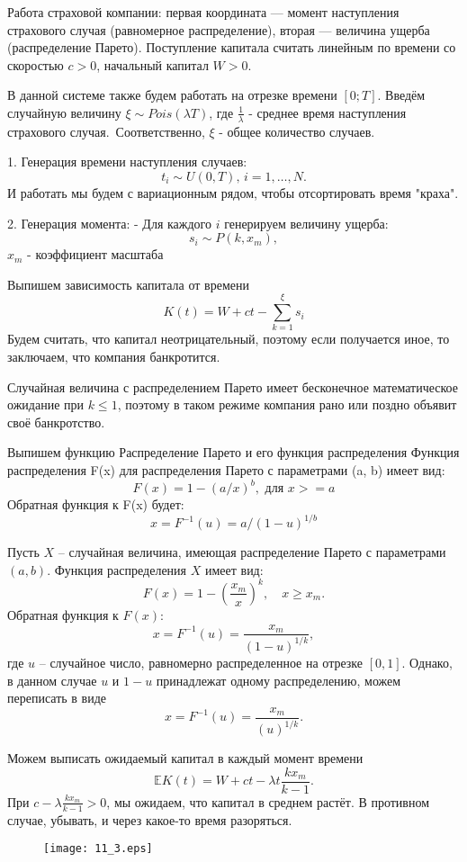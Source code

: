 \documentclass[11pt]{article}
\begin{document}
Работа страховой компании: первая координата — момент наступления страхового случая (равномерное распределение), вторая — величина ущерба (распределение Парето). Поступление капитала считать линейным по времени со скоростью $c > 0$, начальный капитал $W > 0$.


В данной системе также будем работать на отрезке времени $[0;T]$. Введём случайную величину $\xi \sim Pois (\lambda T)$, где $\frac{1}{\lambda}$ - среднее время наступления страхового случая.\
Соответственно, $\xi$ - общее количество случаев.

1. Генерация времени наступления случаев:
   $$
   t_i \sim U(0, T), \, i = 1, \dots, N.
   $$
   И работать мы будем с вариационным рядом, чтобы отсортировать время "краха".
   
2. Генерация момента:
   - Для каждого $i$ генерируем величину ущерба:
   $$
   s_i \sim P(k, x_m),
   $$
   $x_m$ - коэффициент масштаба

   
Выпишем зависимость капитала от времени
$$
    K(t) = W + ct - \sum_{k=1}^{\xi}s_i
$$
Будем считать, что капитал неотрицательный, поэтому если получается иное, то заключаем, что компания банкротится.

Случайная величина с распределением Парето имеет бесконечное математическое ожидание при $k \leqslant 1$, поэтому в таком режиме компания рано или поздно объявит своё банкротство. 

Выпишем функцию 
Распределение Парето и его функция распределения
Функция распределения F(x) для распределения Парето с параметрами (a, b) имеет вид:
$$
F(x) = 1 - (a/x)^b,  \text{ для } x >= a
$$
Обратная функция к F(x) будет:
$$
  x = F^{-1}(u) = a / (1-u)^{1/b}
$$

Пусть $X$ – случайная величина, имеющая распределение Парето с параметрами $(a, b)$. 
Функция распределения $X$ имеет вид:
$$
F(x) = 1 - \left(\frac{x_m}{x}\right)^k, \quad x \geqslant x_m.
$$
Обратная функция к $F(x)$:
$$
x = F^{-1}(u) = \frac{x_m}{(1-u)^{1/k}},
$$
где $u$ – случайное число, равномерно распределенное на отрезке $[0, 1]$. Однако, в данном случае $u$ и $1-u$ принадлежат одному распределению, можем переписать в виде
$$
x = F^{-1}(u) = \frac{x_m}{(u)^{1/k}}.
$$

Можем выписать ожидаемый капитал в каждый момент времени
$$
    \mathbb{E}K(t) = W + ct - \lambda t \frac{k x_m}{k-1}.
$$
При $ c - \lambda \frac{k x_m}{k - 1} > 0$, мы ожидаем, что капитал в среднем растёт. В противном случае, убывать, и через какое-то время разоряться.

\begin{figure}[ht]
    \texttt{[image: 11\_3.eps]} 
    \caption{}
\end{figure} 
\FloatBarrier
\end{document}

